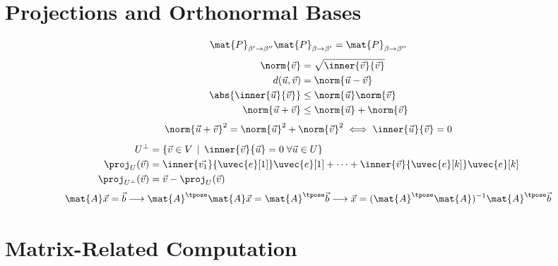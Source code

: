 \documentclass[10pt, a4paper]{article}
\begin{document}
\begin{landscape}
\begin{multicols}{3}
    \section{Projections and Orthonormal Bases}

    \[\mat{P}_{\beta' \to \beta''} \mat{P}_{\beta \to \beta'} = \mat{P}_{\beta \to \beta''}\]
    \begin{align*}
        \norm{\vec{v}} &= \sqrt{\inner{\vec{v}}{\vec{v}}} \\
        d(\vec{u}, \vec{v}) &= \norm{\vec{u} - \vec{v}} \\
        \abs{\inner{\vec{u}}{\vec{v}}} &\leq \norm{\vec{u}} \norm{\vec{v}} \\
        \norm{\vec{u} + \vec{v}} &\leq \norm{\vec{u}} + \norm{\vec{v}}
    \end{align*}
    \[
        \norm{\vec{u} + \vec{v}}^{2} = \norm{\vec{u}}^{2} + \norm{\vec{v}}^{2} \iff \inner{\vec{u}}{\vec{v}} = 0
    \]
    \begin{align*}
        U^{\perp} &= \left\{ \vec{v} \in V \,\mid\, \inner{\vec{v}}{\vec{u}} = 0 \;\forall \vec{u} \in U \right\} \\
        \proj_{U} (\vec{v}) &= \inner{\vec{v_1}}{\uvec{e}[1]} \uvec{e}[1] + \cdots + \inner{\vec{v}}{\uvec{e}[k]} \uvec{e}[k] \\
    \proj_{U^{\perp}} (\vec{v}) &= \vec{v} - \proj_{U} (\vec{v})
    \end{align*}
    \[\mat{A}\vec{x} = \vec{b} \longrightarrow \mat{A}^{\tpose} \mat{A} \vec{x} = \mat{A}^{\tpose} \vec{b}
    \longrightarrow \vec{x} = (\mat{A}^{\tpose} \mat{A})^{-1} \mat{A}^{\tpose} \vec{b}\]

    \section{Matrix-Related Computation}


\end{multicols}
\end{landscape}
\end{document}
